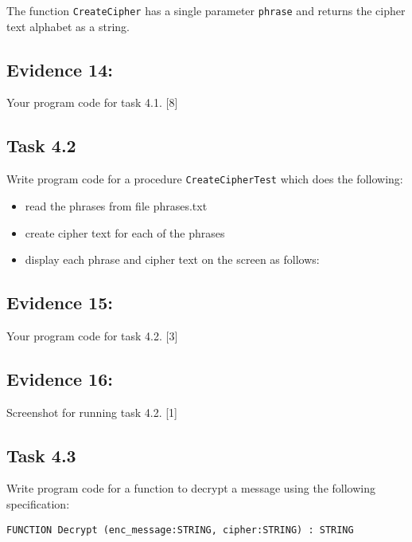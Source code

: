 The function \texttt{CreateCipher} has a single parameter \texttt{phrase}
and returns the cipher text alphabet as a string. 

\subsection*{Evidence 14: }

Your program code for task 4.1.\hfill{} {[}8{]}

\subsection*{Task 4.2 }

Write program code for a procedure \texttt{CreateCipherTest} which
does the following: 
\begin{itemize}
\item read the phrases from file phrases.txt 
\item create cipher text for each of the phrases 
\item display each phrase and cipher text on the screen as follows: 

\noindent{}
\end{itemize}

\subsection*{Evidence 15: }

Your program code for task 4.2.\hfill{} {[}3{]}

\subsection*{Evidence 16: }

Screenshot for running task 4.2. \hfill{}{[}1{]}

\subsection*{Task 4.3}

Write program code for a function to decrypt a message using the following
specification: 
\noindent \begin{center}
\texttt{FUNCTION Decrypt (enc\_message:STRING, cipher:STRING) : STRING }
\par\end{center}


